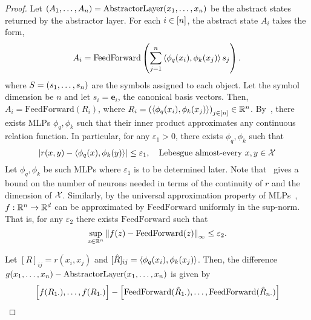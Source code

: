 \begin{proof}
    Let $(A_1, \ldots, A_n) = \mathrm{AbstractorLayer}(x_1, \ldots, x_n)$ be the abstract states returned by the abstractor layer. For each $i \in [n]$,
    the abstract state $A_i$ takes the form,
    \begin{equation*}
        A_i = \mathrm{FeedForward}\left(\sum_{j=1}^{n} \left \langle \phi_q(x_i), \phi_k(x_j) \right\rangle s_j\right).
    \end{equation*}
    where $S = (s_1, \ldots, s_n)$ are the symbols assigned to each object. Let the symbol dimension be $n$ and let $s_i = \bm{e}_i$, the canonical basis vectors. Then, $A_i = \mathrm{FeedForward}(R_i)$, where $R_i = {(\left \langle \phi_q(x_i), \phi_k(x_j) \right\rangle)}_{j \in [n]} \in \mathbb{R}^n$. By~\citep[Theorem 3.1]{altabaaApproximationRelationFunctions2024}, there exists MLPs $\phi_q, \phi_k$ such that their inner product approximates any continuous relation function. In particular, for any $\varepsilon_1 > 0$, there exists $\phi_q, \phi_k$ such that
    \begin{equation}\label{eq:approx_proof_r_approx}
        \left\lvert r(x, y) - \left \langle \phi_q(x), \phi_k(y) \right\rangle\right\rvert \leq \varepsilon_1, \quad \text{Lebesgue almost-every } x,y \in {\mathcal{X}}
    \end{equation}
    Let $\phi_q, \phi_k$ be such MLPs where $\varepsilon_1$ is to be determined later. Note that~\citep{altabaaApproximationRelationFunctions2024} gives a bound on the number of neurons needed in terms of the continuity of $r$ and the dimension of ${\mathcal{X}}$. Similarly, by the universal approximation property of MLPs~\citep[e.g.,][]{cybenkoApproximationSuperpositions1989}, $f: \mathbb{R}^{n} \to \mathbb{R}^{d}$ can be approximated by $\mathrm{FeedForward}$ uniformly in the sup-norm. That is, for any $\varepsilon_2$ there exists $\mathrm{FeedForward}$ such that
    \begin{equation}\label{eq:approx_proof_f_approx}
        \sup_{z \in \mathbb{R}^n} \left\lVert f(z) - \mathrm{FeedForward}(z)\right\rVert_{\infty} \leq \varepsilon_2.
    \end{equation}

    Let $[R]_{ij} = r(x_i, x_j)$ and $[\hat{R}]_{ij} = \left \langle \phi_q(x_i), \phi_k(x_j) \right\rangle$. Then, the difference $g(x_1, \ldots, x_n) - \mathrm{AbstractorLayer}(x_1, \ldots, x_n)$ is given by
    \begin{equation}\label{eq:approx_proof_diff}
        \Big[f(R_{1\cdot}), \ldots, f(R_{1\cdot})\Big] - \Big[\mathrm{FeedForward}(\hat{R}_{1\cdot}), \ldots, \mathrm{FeedForward}(\hat{R}_{n\cdot})\Big]
    \end{equation}


\end{proof}
